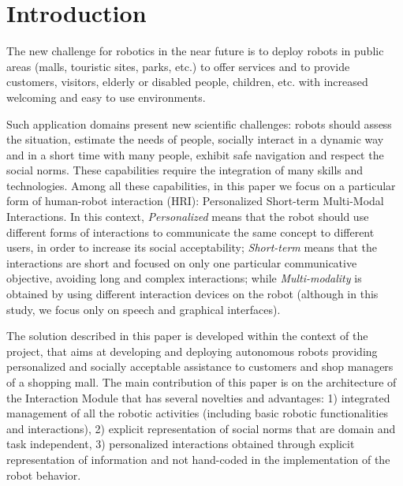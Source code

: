 \section{Introduction}
\vspace{-0.1cm}

The new challenge for robotics in the near future is to deploy robots in public areas (malls, touristic sites, parks, etc.) to offer services and to provide customers, visitors, elderly or disabled people, children, etc.  with increased welcoming and easy to use environments. 

Such application domains present new scientific challenges: robots should assess the situation, estimate the needs of people, socially interact in a dynamic way and in a short time with many people, exhibit safe navigation and respect the social norms. These capabilities require the integration of many skills and technologies.
Among all these capabilities, in this paper we focus on a particular form of human-robot interaction (HRI):
Personalized Short-term Multi-Modal Interactions.
In this context, \emph{Personalized} means that the robot should use different forms of interactions to communicate the same concept to different users, in order to increase its social acceptability;
\emph{Short-term} means that the interactions are short and focused on only one particular communicative objective, avoiding long and complex interactions; while
\emph{Multi-modality} is obtained by using different interaction devices on the robot (although in this study, we focus only on speech and graphical interfaces).

The solution described in this paper is developed within the context of the \coaches  project, 
that aims at developing and deploying autonomous robots providing personalized and socially acceptable assistance to customers and shop managers of a shopping mall.
The main contribution of this paper is on the architecture of the Interaction Module that has several novelties and advantages: 1) integrated management of all the robotic activities (including basic robotic functionalities and interactions), 2) explicit representation of social norms that are domain and task independent, 3) personalized interactions obtained through explicit representation of information and not hand-coded in the implementation of the robot behavior.

